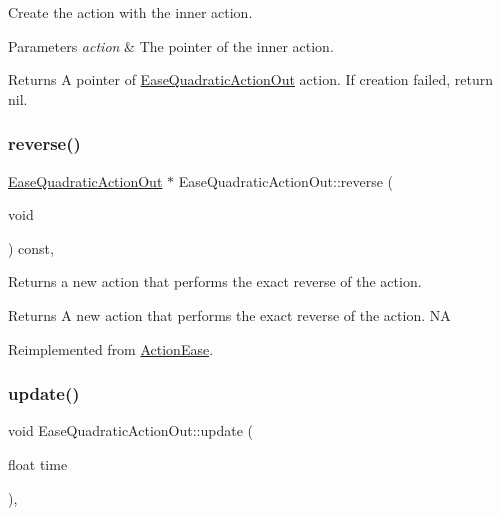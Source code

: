 Create the action with the inner action. 


\begin{DoxyParams}{Parameters}
{\em action} & The pointer of the inner action. \\
\hline
\end{DoxyParams}
\begin{DoxyReturn}{Returns}
A pointer of \hyperlink{classEaseQuadraticActionOut}{Ease\+Quadratic\+Action\+Out} action. If creation failed, return nil. 
\end{DoxyReturn}
\mbox{\label{classEaseQuadraticActionOut_ab7d8416ee33216c79f39beb9e775854c}} 
\subsubsection{\texorpdfstring{reverse()}{reverse()}}
{\footnotesize\ttfamily \hyperlink{classEaseQuadraticActionOut}{Ease\+Quadratic\+Action\+Out} $\ast$ Ease\+Quadratic\+Action\+Out\+::reverse (\begin{DoxyParamCaption}\item[{void}]{ }\end{DoxyParamCaption}) const\hspace{0.3cm}{\ttfamily [override]}, {\ttfamily [virtual]}}

Returns a new action that performs the exact reverse of the action.

\begin{DoxyReturn}{Returns}
A new action that performs the exact reverse of the action.  NA 
\end{DoxyReturn}


Reimplemented from \hyperlink{classActionEase_ab99eb083fa033fae1d6c948fdc730782}{Action\+Ease}.

\mbox{\label{classEaseQuadraticActionOut_afa53b3044fab72ac2ad29a6c2a4b2a24}} 
\subsubsection{\texorpdfstring{update()}{update()}}
{\footnotesize\ttfamily void Ease\+Quadratic\+Action\+Out\+::update (\begin{DoxyParamCaption}\item[{float}]{time }\end{DoxyParamCaption})\hspace{0.3cm}{\ttfamily [override]}, {\ttfamily [virtual]}}

